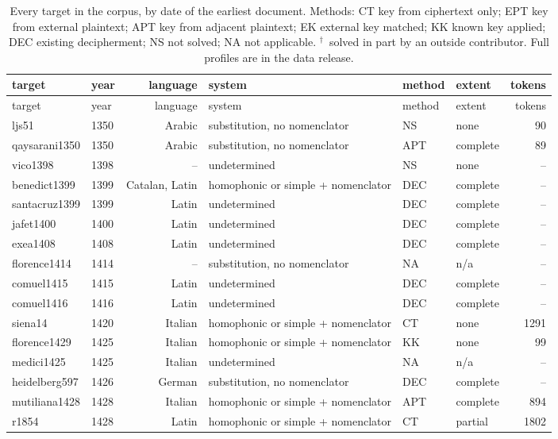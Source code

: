 \clearpage
{\scriptsize
\begin{longtable}{@{}llrlllr@{}}
\caption{\label{tab:all} Every target in the corpus, by date of the earliest document. Methods: CT key from ciphertext only; EPT key from external plaintext; APT key from adjacent plaintext; EK external key matched; KK known key applied; DEC existing decipherment; NS not solved; NA not applicable. $^\dagger$~solved in part by an outside contributor. Full profiles are in the data release.}\\
\toprule
target & year & language & system & method & extent & tokens \\
\midrule
\endfirsthead
\toprule
target & year & language & system & method & extent & tokens \\
\midrule
\endhead
\bottomrule
\endlastfoot
ljs51 & 1350 & Arabic & substitution, no nomenclator & NS & none & 90 \\
qaysarani1350 & 1350 & Arabic & substitution, no nomenclator & APT & complete & 89 \\
vico1398 & 1398 & -- & undetermined & NS & none & -- \\
benedict1399 & 1399 & Catalan, Latin & homophonic or simple + nomenclator & DEC & complete & -- \\
santacruz1399 & 1399 & Latin & undetermined & DEC & complete & -- \\
jafet1400 & 1400 & Latin & undetermined & DEC & complete & -- \\
exea1408 & 1408 & Latin & undetermined & DEC & complete & -- \\
florence1414 & 1414 & -- & substitution, no nomenclator & NA & n/a & -- \\
comuel1415 & 1415 & Latin & undetermined & DEC & complete & -- \\
comuel1416 & 1416 & Latin & undetermined & DEC & complete & -- \\
siena14 & 1420 & Italian & homophonic or simple + nomenclator & CT & none & 1291 \\
florence1429 & 1425 & Italian & homophonic or simple + nomenclator & KK & none & 99 \\
medici1425 & 1425 & Italian & undetermined & NA & n/a & -- \\
heidelberg597 & 1426 & German & substitution, no nomenclator & DEC & complete & -- \\
mutiliana1428 & 1428 & Italian & homophonic or simple + nomenclator & APT & complete & 894 \\
r1854 & 1428 & Latin & homophonic or simple + nomenclator & CT & partial & 1802 \\

\end{longtable}}
